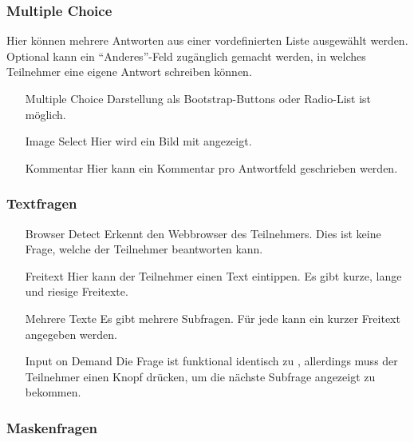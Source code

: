 \subsubsection{Multiple Choice}

Hier können mehrere Antworten aus einer vordefinierten Liste ausgewählt werden.
Optional kann ein \enquote{Anderes}-Feld zugänglich gemacht werden, in welches Teilnehmer eine eigene Antwort schreiben können.

\begin{itemize}
	\item[Multiple Choice] Darstellung als Bootstrap-Buttons oder Radio-List ist möglich.
	\item[Image Select] Hier wird ein Bild mit angezeigt.
	\item[Kommentar] Hier kann ein Kommentar pro Antwortfeld geschrieben werden.
\end{itemize}

\subsubsection{Textfragen}

\begin{itemize}
	\item[Browser Detect] Erkennt den Webbrowser des Teilnehmers. Dies ist keine Frage, welche der Teilnehmer beantworten kann.
	\item[Freitext] Hier kann der Teilnehmer einen Text eintippen. Es gibt kurze, lange und riesige Freitexte.
	\item[Mehrere Texte] Es gibt mehrere Subfragen. Für jede kann ein kurzer Freitext angegeben werden.
	\item[Input on Demand] Die Frage ist funktional identisch zu , allerdings muss der Teilnehmer einen Knopf drücken, um die nächste Subfrage angezeigt zu bekommen.
\end{itemize}

\subsubsection{Maskenfragen}

